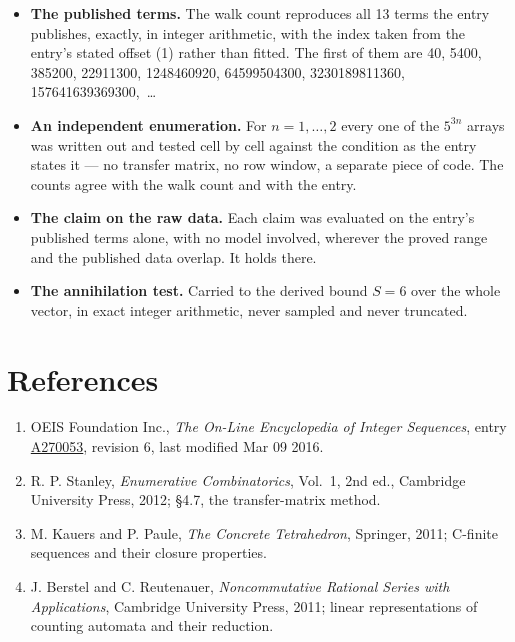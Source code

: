 \documentclass[11pt]{article}
\theoremstyle{definition}
\begin{document}
\begin{itemize}

\item {\bfseries The published terms.} The walk count reproduces all 13 terms the entry publishes, exactly, in integer arithmetic, with the index taken from the entry's stated offset (1) rather than fitted. The first of them are 40, 5400, 385200, 22911300, 1248460920, 64599504300, 3230189811360, 157641639369300,~\dots

\item {\bfseries An independent enumeration.} For $n = 1,\dots,2$ every one of the $5^{3n}$ arrays was written out and tested cell by cell against the condition as the entry states it --- no transfer matrix, no row window, a separate piece of code. The counts agree with the walk count and with the entry.

\item {\bfseries The claim on the raw data.} Each claim was evaluated on the entry's published terms alone, with no model involved, wherever the proved range and the published data overlap. It holds there.

\item {\bfseries The annihilation test.} Carried to the derived bound $S = 6$ over the whole vector, in exact integer arithmetic, never sampled and never truncated.

\end{itemize}

\section{References}

\begin{enumerate}

\item OEIS Foundation Inc., \emph{The On-Line Encyclopedia of Integer Sequences}, entry \href{https://oeis.org/A270053}{A270053}, revision 6, last modified Mar 09 2016.

\item R. P. Stanley, \emph{Enumerative Combinatorics}, Vol.~1, 2nd ed., Cambridge University Press, 2012; \S4.7, the transfer-matrix method.

\item M. Kauers and P. Paule, \emph{The Concrete Tetrahedron}, Springer, 2011; C-finite sequences and their closure properties.

\item J. Berstel and C. Reutenauer, \emph{Noncommutative Rational Series with Applications}, Cambridge University Press, 2011; linear representations of counting automata and their reduction.

\end{enumerate}
\end{document}
